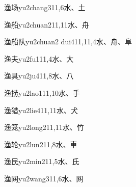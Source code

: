 \begin{EntryWithPhonetic}{渔场}{yu2chang3}{11,6}{⽔、⼟}
\end{EntryWithPhonetic}

\begin{EntryWithPhonetic}{渔船}{yu2chuan2}{11,11}{⽔、⾈}
\end{EntryWithPhonetic}

\begin{EntryWithPhonetic}{渔船队}{yu2chuan2 dui4}{11,11,4}{⽔、⾈、⾩}
\end{EntryWithPhonetic}

\begin{EntryWithPhonetic}{渔夫}{yu2fu1}{11,4}{⽔、⼤}
\end{EntryWithPhonetic}

\begin{EntryWithPhonetic}{渔具}{yu2ju4}{11,8}{⽔、⼋}
\end{EntryWithPhonetic}

\begin{EntryWithPhonetic}{渔捞}{yu2lao1}{11,10}{⽔、⼿}
\end{EntryWithPhonetic}

\begin{EntryWithPhonetic}{渔猎}{yu2lie4}{11,11}{⽔、⽝}
\end{EntryWithPhonetic}

\begin{EntryWithPhonetic}{渔笼}{yu2long2}{11,11}{⽔、⽵}
\end{EntryWithPhonetic}

\begin{EntryWithPhonetic}{渔轮}{yu2lun2}{11,8}{⽔、⾞}
\end{EntryWithPhonetic}

\begin{EntryWithPhonetic}{渔民}{yu2min2}{11,5}{⽔、⽒}
\end{EntryWithPhonetic}

\begin{EntryWithPhonetic}{渔网}{yu2wang3}{11,6}{⽔、⽹}
\end{EntryWithPhonetic}

